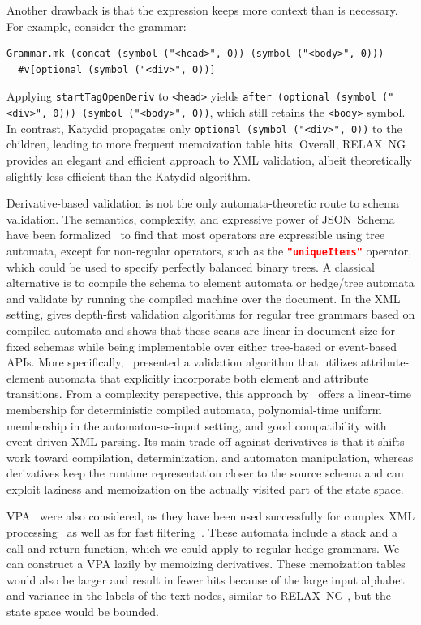 \documentclass[acmsmall,%
  screen,%
  authorversion, %
  nonacm%
]{acmart}
\newcommand{\RelaxNG}{%
  RELAX~NG\xspace%
}
\newcommand{\JSONSchema}{%
  JSON~Schema\xspace%
}
\newcommand{\uniqueItems}{%
  \lstinline[language=json]|"uniqueItems"|\xspace%
}
\newcommand{\VPA}{\ac{VPA}\xspace}
\newcommand{\XML}{\ac{XML}\xspace}
\begin{document}
Another drawback is that the expression keeps more context than is necessary.
For example, consider the grammar:
\begin{lstlisting}
Grammar.mk (concat (symbol ("<head>", 0)) (symbol ("<body>", 0)))
  #v[optional (symbol ("<div>", 0))]
\end{lstlisting}
Applying \lstinline{startTagOpenDeriv} to \lstinline{<head>} yields \lstinline{after (optional (symbol ("<div>", 0))) (symbol ("<body>", 0))}, which still retains the \lstinline{<body>} symbol.
In contrast, Katydid propagates only \lstinline{optional (symbol ("<div>", 0))} to the children, leading to more frequent memoization table hits.
Overall, \RelaxNG provides an elegant and efficient approach to \XML validation, albeit theoretically slightly less efficient than the Katydid algorithm.

Derivative-based validation is not the only automata-theoretic route to schema validation. 
The semantics, complexity, and expressive power of \JSONSchema have been formalized~\cite{jsonschemafoundations} to find that most operators are expressible using tree automata, except for non-regular operators, such as the \uniqueItems operator, which could be used to specify perfectly balanced binary trees.
A classical alternative is to compile the schema to element automata or hedge/tree automata and validate by running the compiled machine over the document. 
In the \XML setting, \citet{murata2005taxonomy} gives depth-first validation algorithms for regular tree grammars based on compiled automata and shows that these scans are linear in document size for fixed schemas while being implementable over either tree-based or event-based APIs. 
More specifically,~\citet{hosoya2002validation} presented a validation algorithm that utilizes attribute-element automata that explicitly incorporate both element and attribute transitions. 
From a complexity perspective, this approach by~\citet{hosoya2002validation} offers a linear-time membership for deterministic compiled automata, polynomial-time uniform membership in the automaton-as-input setting, and good compatibility with event-driven \XML parsing. 
Its main trade-off against derivatives is that it shifts work toward compilation, determinization, and automaton manipulation, whereas derivatives keep the runtime representation closer to the source schema and can exploit laziness and memoization on the actually visited part of the state space.

\VPA~\cite{alur2004visibly} were also considered, as they have been used successfully for complex \XML processing~\cite{mozafari2012high} as well as for fast filtering~\cite{kumar2007visibly}.
These automata include a stack and a call and return function, which we could apply to regular hedge grammars.
We can construct a \VPA lazily by memoizing derivatives.
These memoization tables would also be larger and result in fewer hits because of the large input alphabet and variance in the labels of the text nodes, similar to \RelaxNG, but the state space would be bounded.
\end{document}
